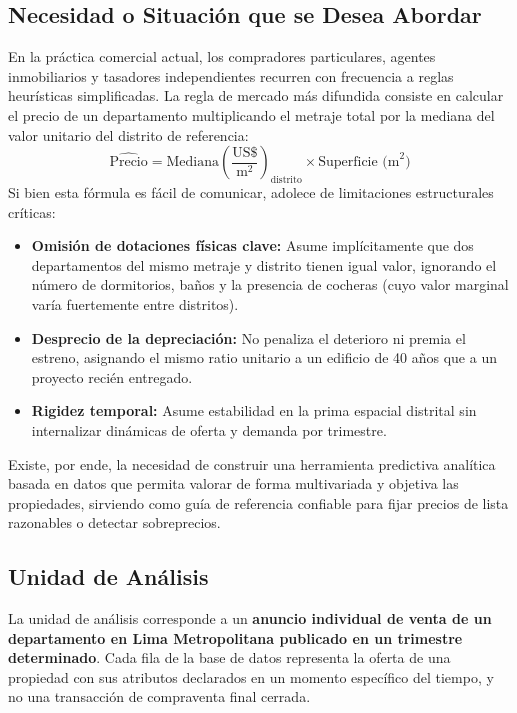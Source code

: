 \documentclass[11pt,a4paper]{article}
\begin{document}
\subsection{Necesidad o Situación que se Desea Abordar}
En la práctica comercial actual, los compradores particulares, agentes inmobiliarios y tasadores independientes recurren con frecuencia a reglas heurísticas simplificadas. La regla de mercado más difundida consiste en calcular el precio de un departamento multiplicando el metraje total por la mediana del valor unitario del distrito de referencia:
\begin{equation}
    \widehat{\text{Precio}} = \text{Mediana}\left(\frac{\text{US\$}}{\text{m}^2}\right)_{\text{distrito}} \times \text{Superficie (m}^2\text{)}
    \label{eq:regla_mercado}
\end{equation}
Si bien esta fórmula es fácil de comunicar, adolece de limitaciones estructurales críticas:
\begin{itemize}[leftmargin=1.5cm]
    \item \textbf{Omisión de dotaciones físicas clave:} Asume implícitamente que dos departamentos del mismo metraje y distrito tienen igual valor, ignorando el número de dormitorios, baños y la presencia de cocheras (cuyo valor marginal varía fuertemente entre distritos).
    \item \textbf{Desprecio de la depreciación:} No penaliza el deterioro ni premia el estreno, asignando el mismo ratio unitario a un edificio de 40 años que a un proyecto recién entregado.
    \item \textbf{Rigidez temporal:} Asume estabilidad en la prima espacial distrital sin internalizar dinámicas de oferta y demanda por trimestre.
\end{itemize}
Existe, por ende, la necesidad de construir una herramienta predictiva analítica basada en datos que permita valorar de forma multivariada y objetiva las propiedades, sirviendo como guía de referencia confiable para fijar precios de lista razonables o detectar sobreprecios.

\subsection{Unidad de Análisis}
La unidad de análisis corresponde a un \textbf{anuncio individual de venta de un departamento en Lima Metropolitana publicado en un trimestre determinado}. Cada fila de la base de datos representa la oferta de una propiedad con sus atributos declarados en un momento específico del tiempo, y no una transacción de compraventa final cerrada.
\end{document}
